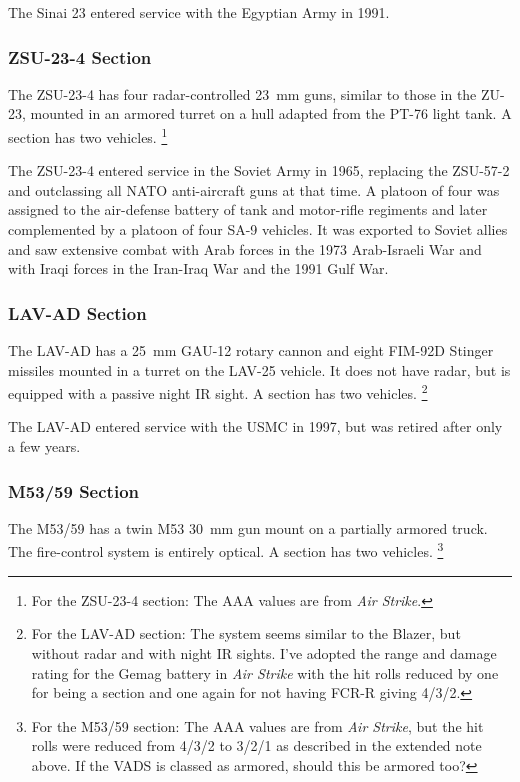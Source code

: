\documentclass[10pt]{article}
\newcommand{\note}[1]{%
    \footnote{%
        \setlength{\parindent}{0pt}%
        \setlength{\parskip}{\smallskipamount}%
        #1
    }%
}
\begin{document}
The Sinai 23 entered service with the Egyptian Army in 1991.

\subsubsection{ZSU-23-4 Section}

The ZSU-23-4 has four radar-controlled 23~mm guns, similar to those in the ZU-23, mounted in an armored turret on a hull adapted from the PT-76 light tank. A section has two vehicles.%
\note{
    For the ZSU-23-4 section: The AAA values are from \emph{Air Strike}.
}

The ZSU-23-4 entered service in the Soviet Army in 1965, replacing the ZSU-57-2 and outclassing all NATO anti-aircraft guns at that time. A platoon of four was assigned to the air-defense battery of tank and motor-rifle regiments and later complemented by a platoon of four SA-9 vehicles. It was exported to Soviet allies and saw extensive combat with Arab forces in the 1973 Arab-Israeli War and with Iraqi forces in the Iran-Iraq War and the 1991 Gulf War.

\subsubsection{LAV-AD Section}

The LAV-AD has a 25~mm GAU-12 rotary cannon and eight FIM-92D Stinger missiles mounted in a turret on the LAV-25 vehicle. It does not have radar, but is equipped with a passive night IR sight. A section has two vehicles.%
\note{
    For the LAV-AD section: The system seems similar to the Blazer, but without radar and with night IR sights. I've adopted the range and damage rating for the Gemag battery in \emph{Air Strike} with the hit rolls reduced by one for being a section and one again for not having FCR-R giving 4/3/2.
}

The LAV-AD entered service with the USMC in 1997, but was retired after only a few years.

\subsubsection{M53/59 Section}

The M53/59 has a twin M53 30~mm gun mount on a partially armored truck. The fire-control system is entirely optical. A section has two vehicles.%
\note{
    For the M53/59 section: The AAA values are from \emph{Air Strike}, but the hit rolls were reduced from 4/3/2 to 3/2/1 as described in the extended note above.
    If the VADS is classed as armored, should this be armored too?
}
\end{document}
